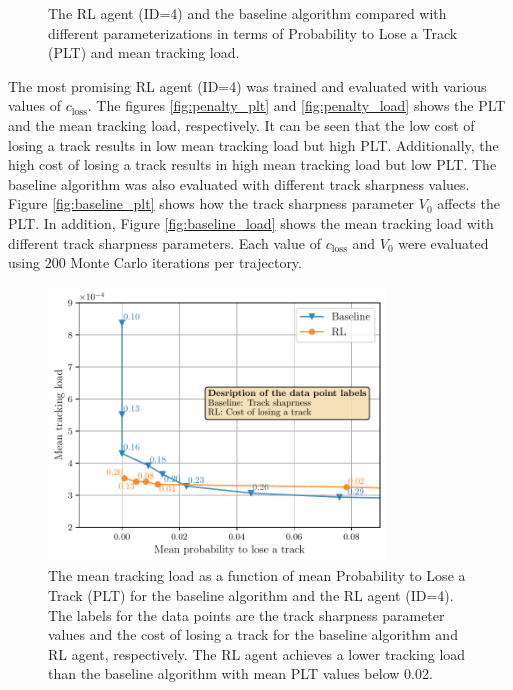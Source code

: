 \documentclass[english, 12pt, a4paper, elec, utf8, a-1b, online]{aaltothesis}
\numberwithin{equation}{section}
\newcommand{\closs}{c_\text{loss}}
\begin{document}
\begin{figure}
    \caption{The RL agent (ID=4) and the baseline algorithm compared with different parameterizations in terms of Probability to Lose a Track (PLT) and mean tracking load.}
    \label{fig:comparison}
\end{figure}

The most promising RL agent (ID=4) was trained and evaluated with various values of $\closs$.
The figures \ref{fig:penalty_plt} and \ref{fig:penalty_load} shows the PLT and the mean tracking load, respectively.
It can be seen that the low cost of losing a track results in low mean tracking load but high PLT.
Additionally, the high cost of losing a track results in high mean tracking load but low PLT.
The baseline algorithm was also evaluated with different track sharpness values.
Figure \ref{fig:baseline_plt} shows how the track sharpness parameter $V_0$ affects the PLT.
In addition, Figure \ref{fig:baseline_load} shows the mean tracking load with different track sharpness parameters.
Each value of $\closs$ and $V_0$ were evaluated using $200$ Monte Carlo iterations per trajectory.

\begin{figure}
    \centering
    \includegraphics[width=0.8\textwidth]{figures/benchmark/Simulations/rl_baseline_comparison.pdf}
    \caption{The mean tracking load as a function of mean Probability to Lose a Track (PLT) for the baseline algorithm and the RL agent (ID=4). The labels for the data points are the track sharpness parameter values and the cost of losing a track for the baseline algorithm and RL agent, respectively. The RL agent achieves a lower tracking load than the baseline algorithm with mean PLT values below 0.02.}
    \label{fig:comparison_TL_PLT}
\end{figure}
\end{document}
